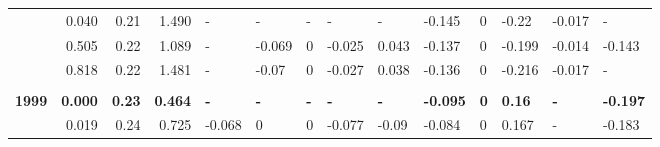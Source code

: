 \documentclass[
]{article}
\begin{document}
\begin{table}[!h]
{\begin{tabular}[t]{lrrrllllllllll}
\hspace{1em} & 0.040 & 0.21 & 1.490 & - & - & - & - & - & -0.145 & 0 & -0.22 & -0.017 & -\\
\hspace{1em} & 0.505 & 0.22 & 1.089 & - & -0.069 & 0 & -0.025 & 0.043 & -0.137 & 0 & -0.199 & -0.014 & -0.143\\
\hspace{1em} & 0.818 & 0.22 & 1.481 & - & -0.07 & 0 & -0.027 & 0.038 & -0.136 & 0 & -0.216 & -0.017 & -\\
\addlinespace[.4em]
\multicolumn{1}{l}{\textbf{}}\\
\textbf{\hspace{1em}1999} & \textbf{0.000} & \textbf{0.23} & \textbf{0.464} & \textbf{-} & \textbf{-} & \textbf{-} & \textbf{-} & \textbf{-} & \textbf{-0.095} & \textbf{0} & \textbf{0.16} & \textbf{-} & \textbf{-0.197}\\
\hspace{1em} & 0.019 & 0.24 & 0.725 & -0.068 & 0 & 0 & -0.077 & -0.09 & -0.084 & 0 & 0.167 & - & -0.183\\
\bottomrule
\end{tabular}}
\end{table}

\newpage
\end{document}
